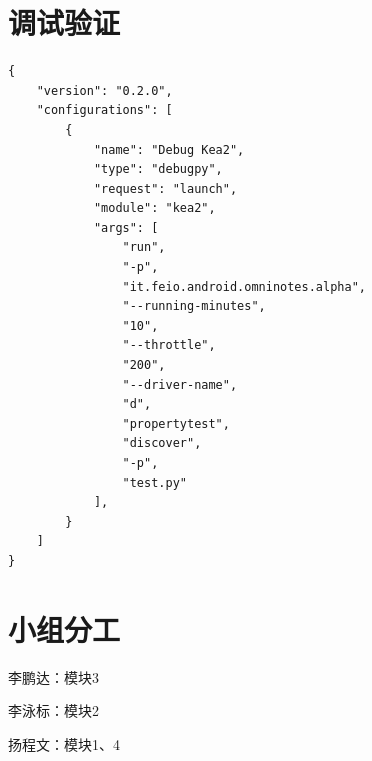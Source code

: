 \documentclass[a4paper, zihao=-4]{ctexart}
\begin{document}
\section{调试验证}

\begin{lstlisting}[label=code:lanch.json, caption=VS Code lanch.json 配置]
{
    "version": "0.2.0",
    "configurations": [
        {
            "name": "Debug Kea2",
            "type": "debugpy",
            "request": "launch",
            "module": "kea2",
            "args": [
                "run",
                "-p",
                "it.feio.android.omninotes.alpha",
                "--running-minutes",
                "10",
                "--throttle",
                "200",
                "--driver-name",
                "d",
                "propertytest",
                "discover",
                "-p",
                "test.py"
            ],
        }
    ]
}   
\end{lstlisting}

\section{小组分工}

李鹏达：模块3

李泳标：模块2

扬程文：模块1、4
\end{document}
